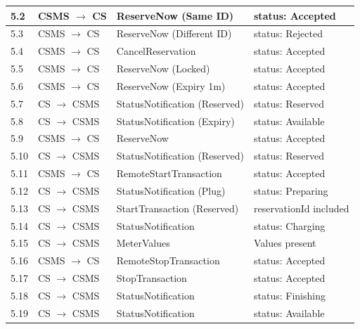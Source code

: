 \documentclass[a4paper,11pt]{report}
\begin{document}
\begin{footnotesize}
\begin{longtable}{|p{1.2cm}|p{2.5cm}|p{5.5cm}|p{6cm}|}
\hline
5.2 & CSMS $\to$ CS & ReserveNow (Same ID) & status: Accepted \\
\hline
5.3 & CSMS $\to$ CS & ReserveNow (Different ID) & status: Rejected \\
\hline
5.4 & CSMS $\to$ CS & CancelReservation & status: Accepted \\
\hline
5.5 & CSMS $\to$ CS & ReserveNow (Locked) & status: Accepted \\
\hline
5.6 & CSMS $\to$ CS & ReserveNow (Expiry 1m) & status: Accepted \\
\hline
5.7 & CS $\to$ CSMS & StatusNotification (Reserved) & status: Reserved \\
\hline
5.8 & CS $\to$ CSMS & StatusNotification (Expiry) & status: Available \\
\hline
5.9 & CSMS $\to$ CS & ReserveNow & status: Accepted \\
\hline
5.10 & CS $\to$ CSMS & StatusNotification (Reserved) & status: Reserved \\
\hline
5.11 & CSMS $\to$ CS & RemoteStartTransaction & status: Accepted \\
\hline
5.12 & CS $\to$ CSMS & StatusNotification (Plug) & status: Preparing \\
\hline
5.13 & CS $\to$ CSMS & StartTransaction (Reserved) & reservationId included \\
\hline
5.14 & CS $\to$ CSMS & StatusNotification & status: Charging \\
\hline
5.15 & CS $\to$ CSMS & MeterValues & Values present \\
\hline
5.16 & CSMS $\to$ CS & RemoteStopTransaction & status: Accepted \\
\hline
5.17 & CS $\to$ CSMS & StopTransaction & status: Accepted \\
\hline
5.18 & CS $\to$ CSMS & StatusNotification & status: Finishing \\
\hline
5.19 & CS $\to$ CSMS & StatusNotification & status: Available \\
\hline


\end{longtable}
\end{footnotesize}
\end{document}
